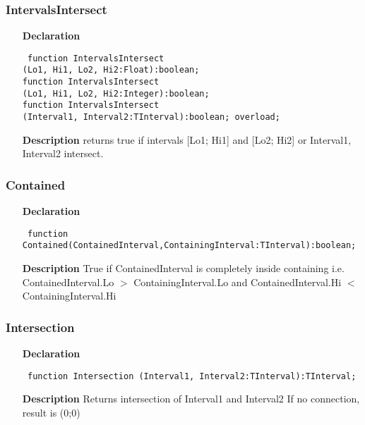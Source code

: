 \documentclass[12pt,a4paper,oneside]{report}
\newcommand{\declarationitem}[1]{\textbf{#1}}
\newcommand{\descriptiontitle}[1]{\textbf{#1}}
\newcommand{\code}[1]{\texttt{#1}}
\begin{document}
\subsubsection{IntervalsIntersect}
\label{uIntervals-IntervalsIntersect}
\begin{itemize}\item[\declarationitem{Declaration}\hfill]
\begin{flushleft}
\code{
function IntervalsIntersect\\
\hspace{3cm}(Lo1, Hi1, Lo2, Hi2:Float):boolean;\\[6pt]
function IntervalsIntersect\\
\hspace{3cm}(Lo1, Hi1, Lo2, Hi2:Integer):boolean;\\[6pt]
function IntervalsIntersect\\
\hspace{3cm}(Interval1, Interval2:TInterval):boolean; overload;}
\end{flushleft}
\item[\descriptiontitle{Description}]
returns true if intervals [Lo1; Hi1] and [Lo2; Hi2] or Interval1, Interval2 intersect.
\end{itemize}
\subsubsection{Contained}
\label{uIntervals-Contained}
\begin{itemize}\item[\declarationitem{Declaration}\hfill]
\begin{flushleft}
\code{
function Contained(ContainedInterval,ContainingInterval:TInterval):boolean;}
\end{flushleft}
\item[\descriptiontitle{Description}]
True if ContainedInterval is completely inside containing i.e. ContainedInterval.Lo {$>$} ContainingInterval.Lo and ContainedInterval.Hi {$<$} ContainingInterval.Hi

\end{itemize}
\subsubsection{Intersection}
\label{uIntervals-Intersection}
\begin{itemize}\item[\declarationitem{Declaration}\hfill]
\begin{flushleft}
\code{
function Intersection
\hspace{3cm}(Interval1, Interval2:TInterval):TInterval;}
\end{flushleft}

\item[\descriptiontitle{Description}]
Returns intersection of Interval1 and Interval2 If no connection, result is (0;0)
\end{itemize}
\end{document}
